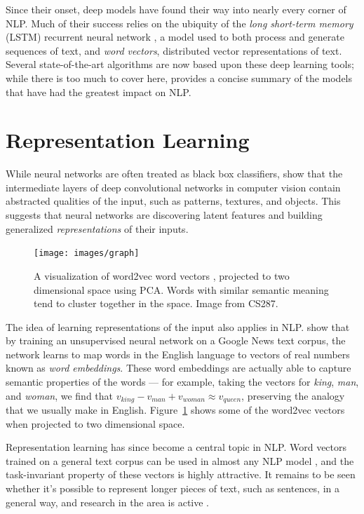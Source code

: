 \documentclass[12pt]{report}
\begin{document}
Since their onset, deep models have found their way into nearly every corner of NLP. Much of their success relies on the ubiquity of the \emph{long short-term memory} (LSTM) recurrent neural network \citep{hochreiter1997long}, a model used to both process and generate sequences of text, and \emph{word vectors}, distributed vector representations of text.
Several state-of-the-art algorithms are now based upon these deep learning tools; while there is too much to cover here, \citet{goldberg2015primer} provides a concise summary of the models that have had the greatest impact on NLP. %

\section{Representation Learning}

While neural networks are often treated as black box classifiers, \citet{Zeiler2014} show that the intermediate layers of deep convolutional networks in computer vision contain abstracted qualities of the input, such as patterns, textures, and objects. This suggests that neural networks are discovering latent features and building generalized \emph{representations} of their inputs.

\begin{figure}[p]
\centering
\texttt{[image: images/graph]}
\caption[Word2vec Clusters]{A visualization of word2vec word vectors \citep{mikolov2013word2vec}, projected to two dimensional space using PCA. Words with similar semantic meaning tend to cluster together in the space. Image from CS287.}
\label{fig:word2vec}
\end{figure}

The idea of learning representations of the input also applies in NLP.
\citet{mikolov2013word2vec} show that by training an unsupervised neural network on a Google News text corpus, the network learns to map words in the English language to vectors of real numbers known as \emph{word embeddings}.
These word embeddings are actually able to capture semantic properties of the words --- for example, taking the vectors for \emph{king}, \emph{man}, and \emph{woman}, we find that $v_{king} - v_{man} + v_{woman} \approx v_{queen}$, preserving the analogy that we usually make in English. Figure~\ref{fig:word2vec} shows some of the word2vec vectors when projected to two dimensional space.

Representation learning has since become a central topic in NLP. Word vectors trained on a general text corpus can be used in almost any NLP model \citep{mikolov2013word2vec, Pennington2014}, and the task-invariant property of these vectors is highly attractive.
It remains to be seen whether it's possible to represent longer pieces of text, such as sentences, in a general way, and research in the area is active \citep{Bowman2016}.
\end{document}
